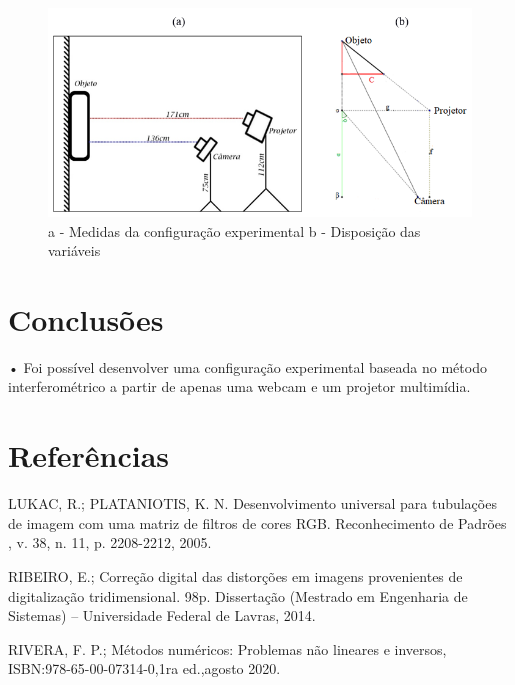 \documentclass[a4paper, 12pt]{article}
\begin{document}
\begin{figure}[H]
	\centering
		\includegraphics[scale=0.5]{medidas_setup.png}
	\caption{a - Medidas da configuração experimental  b - Disposição das variáveis}
	\label{medidas_setup}
\end{figure}


\section{Conclusões}

•	Foi possível desenvolver uma configuração experimental baseada no método interferométrico a partir de apenas uma webcam e um projetor multimídia. 


\section*{Referências}

LUKAC, R.; PLATANIOTIS, K. N. Desenvolvimento universal para tubulações de imagem com uma matriz de filtros de cores RGB. Reconhecimento de Padrões , v. 38, n. 11, p. 2208-2212, 2005.
\vspace{.5cm}

RIBEIRO, E.; Correção digital das distorções em imagens provenientes de digitalização tridimensional. 98p. Dissertação (Mestrado em Engenharia de Sistemas) – Universidade Federal de Lavras, 2014. 
\vspace{.5cm}

RIVERA, F. P.; Métodos numéricos: Problemas não lineares e inversos, ISBN:978-65-00-07314-0,1ra ed.,agosto 2020.
\vspace{.5cm}
\end{document}
